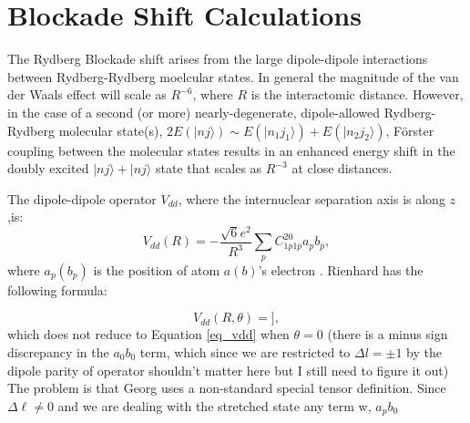 \chapter{Blockade Shift Calculations}\label{app_udd}
The Rydberg Blockade shift arises from the large dipole-dipole interactions between Rydberg-Rydberg moelcular states.
In general the magnitude of the van der Waals effect will scale as $R^{-6}$, where $R$ is the interactomic distance.
However, in the case of a second (or more) nearly-degenerate, dipole-allowed Rydberg-Rydberg molecular state(s), $2E(|nj\rangle) \sim E(|n_{1}j_{1}\rangle) + E(|n_{2}j_{2}\rangle)$, F\"{o}rster coupling between the molecular states results in an enhanced energy shift in the doubly excited $|nj\rangle + |nj\rangle$ state that scales as $R^{-3}$ at close distances.

The dipole-dipole operator $V_{dd}$, where the internuclear separation axis is along $z$,is:
\begin{equation}
  \label{eq_vdd}
  V_{dd}(R) = -\frac{\sqrt{6}e^2}{R^3} \sum\limits_p C^{20}_{1p1\bar{p}}a_p b_{\bar{p}},
\end{equation}
where $a_p(b_p)$ is the position of atom $a(b)$'s electron \cite{WS2007}.
Rienhard has the following formula\cite{Rienhard2007}:

\begin{equation}
  \label{eq_vdd_reinhard}
  V_{dd}(R, \theta ) =
	\Bigr],
\end{equation}
which does not reduce to Equation \ref{eq_vdd} when $\theta=0$ (there is a minus sign discrepancy in the $a_0b_0$ term, which since we are restricted to $\Delta l=\pm 1$ by the dipole parity of operator shouldn't matter here but I still need to figure it out)  The problem is that Georg uses a non-standard special tensor definition.
Since $\Delta \ell \neq 0$ and we are dealing with the stretched state any term w, $a_pb_0$

